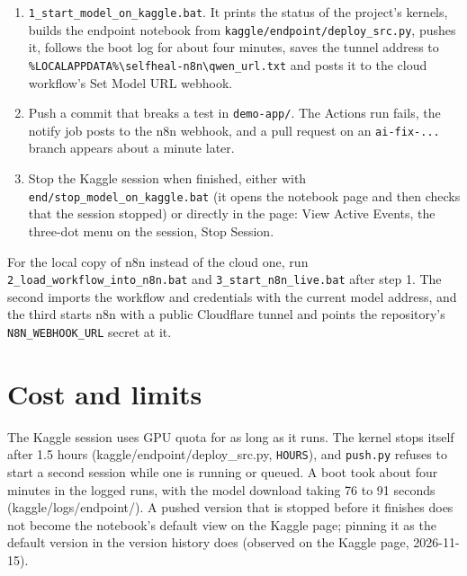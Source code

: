 \documentclass[11pt,a4paper]{report}
\begin{document}
\begin{enumerate}[leftmargin=*,itemsep=2pt]
\item \texttt{1\_\allowbreak{}start\_\allowbreak{}model\_\allowbreak{}on\_\allowbreak{}kaggle.\allowbreak{}bat}. It prints the status of the project's kernels, builds the endpoint notebook from \texttt{kaggle/\allowbreak{}endpoint/\allowbreak{}deploy\_\allowbreak{}src.\allowbreak{}py}, pushes it, follows the boot log for about four minutes, saves the tunnel address to \texttt{\%LOCALAPPDATA\%\textbackslash{}selfheal-\allowbreak{}n8n\textbackslash{}qwen\_\allowbreak{}url.\allowbreak{}txt} and posts it to the cloud workflow's Set Model URL webhook.
\item Push a commit that breaks a test in \texttt{demo-\allowbreak{}app/\allowbreak{}}. The Actions run fails, the notify job posts to the n8n webhook, and a pull request on an \texttt{ai-\allowbreak{}fix-\allowbreak{}.\allowbreak{}.\allowbreak{}.\allowbreak{}} branch appears about a minute later.
\item Stop the Kaggle session when finished, either with \texttt{end/\allowbreak{}stop\_\allowbreak{}model\_\allowbreak{}on\_\allowbreak{}kaggle.\allowbreak{}bat} (it opens the notebook page and then checks that the session stopped) or directly in the page: View Active Events, the three-dot menu on the session, Stop Session.
\end{enumerate}

For the local copy of n8n instead of the cloud one, run \texttt{2\_\allowbreak{}load\_\allowbreak{}workflow\_\allowbreak{}into\_\allowbreak{}n8n.\allowbreak{}bat} and \texttt{3\_\allowbreak{}start\_\allowbreak{}n8n\_\allowbreak{}live.\allowbreak{}bat} after step 1. The second imports the workflow and credentials with the current model address, and the third starts n8n with a public Cloudflare tunnel and points the repository's \texttt{N8N\_\allowbreak{}WEBHOOK\_\allowbreak{}URL} secret at it.

\section{Cost and limits}

The Kaggle session uses GPU quota for as long as it runs. The kernel stops itself after 1.5 hours (kaggle/endpoint/deploy\_src.py, \texttt{HOURS}), and \texttt{push.\allowbreak{}py} refuses to start a second session while one is running or queued. A boot took about four minutes in the logged runs, with the model download taking 76 to 91 seconds (kaggle/logs/endpoint/). A pushed version that is stopped before it finishes does not become the notebook's default view on the Kaggle page; pinning it as the default version in the version history does (observed on the Kaggle page, 2026-11-15).
\end{document}
